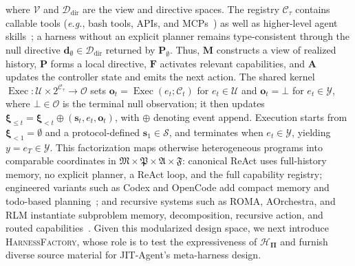 \documentclass{article}
\newcommand{\ourmethod}{JIT-Agent\xspace}
\begin{document}
where $\mathcal{V}$ and $\mathcal{D}_{\mathrm{dir}}$ are the view and directive spaces. The registry $\mathcal{C}_{\tau}$ contains callable tools (\textit{e.g.}, bash tools, APIs, and MCPs~\citep{sarkar2025surveyllmagentcommunication}) as well as higher-level agent skills~\citep{xu2026agentskillslargelanguage,claudeAgentSkills}; a harness without an explicit planner remains type-consistent through the null directive $\mathbf{d}_{\emptyset}\in\mathcal{D}_{\mathrm{dir}}$ returned by $\mathbf{P}_{\emptyset}$. Thus, $\mathbf{M}$ constructs a view of realized history, $\mathbf{P}$ forms a local directive, $\mathbf{F}$ activates relevant capabilities, and $\mathbf{A}$ updates the controller state and emits the next action. The shared kernel $\operatorname{Exec}:\mathcal{U}\times2^{\mathcal{C}_{\tau}}\rightarrow\mathcal{O}$ sets $\mathbf{o}_t=\operatorname{Exec}(e_t;\mathcal{C}_t)$ for $e_t\in\mathcal{U}$ and $\mathbf{o}_t=\bot$ for $e_t\in\mathcal{Y}$, where $\bot\in\mathcal{O}$ is the terminal null observation; it then updates $\boldsymbol{\xi}_{\le t}=\boldsymbol{\xi}_{<t}\oplus(\mathbf{s}_t,e_t,\mathbf{o}_t)$, with $\oplus$ denoting event append. Execution starts from $\boldsymbol{\xi}_{<1}=\emptyset$ and a protocol-defined $\mathbf{s}_1\in\mathcal{S}$, and terminates when $e_t\in\mathcal{Y}$, yielding $y=e_T\in\mathcal{Y}$. This factorization maps otherwise heterogeneous programs into comparable coordinates in $\mathfrak{M}\times\mathfrak{P}\times\mathfrak{A}\times\mathfrak{F}$: canonical ReAct uses full-history memory, no explicit planner, a ReAct loop, and the full capability registry; engineered variants such as Codex and OpenCode add compact memory and todo-based planning~\citep{openaiCodexCoding,githubGitHubOpencodeaiopencode}; and recursive systems such as ROMA, AOrchestra, and RLM instantiate subproblem memory, decomposition, recursive action, and routed capabilities~\citep{alzubi2026romarecursiveopenmetaagent,ruan2026aorchestraautomatingsubagentcreation,zhang2026recursivelanguagemodels}.
Given this modularized design space, we next introduce \textsc{HarnessFactory}, whose role is to test the expressiveness of $\mathcal{H}_{\boldsymbol{\Pi}}$ and furnish diverse source material for \ourmethod's meta-harness design.
\end{document}
